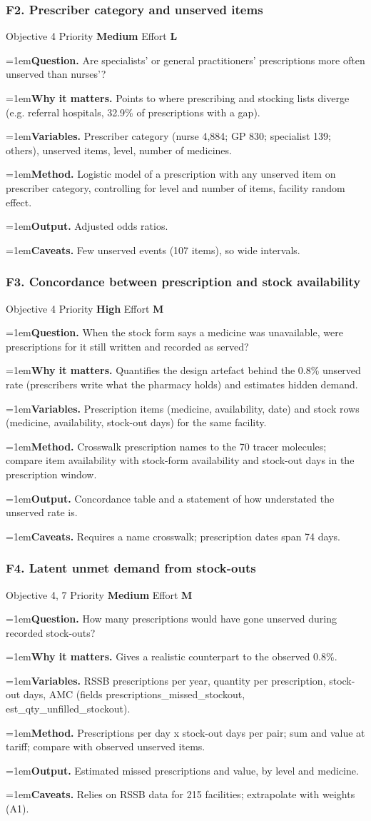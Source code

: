 \documentclass[10pt,a4paper]{article}
\newcommand{\field}[2]{\par\hangindent=1em\textbf{#1.} #2}
\begin{document}
\subsubsection*{F2. Prescriber category and unserved items}
{\footnotesize\color{gray} Objective 4 \textperiodcentered{} Priority \textbf{Medium} \textperiodcentered{} Effort \textbf{L}}
\field{Question}{Are specialists' or general practitioners' prescriptions more often unserved than nurses'?}
\field{Why it matters}{Points to where prescribing and stocking lists diverge (e.g. referral hospitals, 32.9\% of prescriptions with a gap).}
\field{Variables}{Prescriber category (nurse 4,884; GP 830; specialist 139; others), unserved items, level, number of medicines.}
\field{Method}{Logistic model of a prescription with any unserved item on prescriber category, controlling for level and number of items, facility random effect.}
\field{Output}{Adjusted odds ratios.}
\field{Caveats}{Few unserved events (107 items), so wide intervals.}
\subsubsection*{F3. Concordance between prescription and stock availability}
{\footnotesize\color{gray} Objective 4 \textperiodcentered{} Priority \textbf{High} \textperiodcentered{} Effort \textbf{M}}
\field{Question}{When the stock form says a medicine was unavailable, were prescriptions for it still written and recorded as served?}
\field{Why it matters}{Quantifies the design artefact behind the 0.8\% unserved rate (prescribers write what the pharmacy holds) and estimates hidden demand.}
\field{Variables}{Prescription items (medicine, availability, date) and stock rows (medicine, availability, stock-out days) for the same facility.}
\field{Method}{Crosswalk prescription names to the 70 tracer molecules; compare item availability with stock-form availability and stock-out days in the prescription window.}
\field{Output}{Concordance table and a statement of how understated the unserved rate is.}
\field{Caveats}{Requires a name crosswalk; prescription dates span 74 days.}
\subsubsection*{F4. Latent unmet demand from stock-outs}
{\footnotesize\color{gray} Objective 4, 7 \textperiodcentered{} Priority \textbf{Medium} \textperiodcentered{} Effort \textbf{M}}
\field{Question}{How many prescriptions would have gone unserved during recorded stock-outs?}
\field{Why it matters}{Gives a realistic counterpart to the observed 0.8\%.}
\field{Variables}{RSSB prescriptions per year, quantity per prescription, stock-out days, AMC (fields prescriptions\_missed\_stockout, est\_qty\_unfilled\_stockout).}
\field{Method}{Prescriptions per day x stock-out days per pair; sum and value at tariff; compare with observed unserved items.}
\field{Output}{Estimated missed prescriptions and value, by level and medicine.}
\field{Caveats}{Relies on RSSB data for 215 facilities; extrapolate with weights (A1).}
\end{document}
